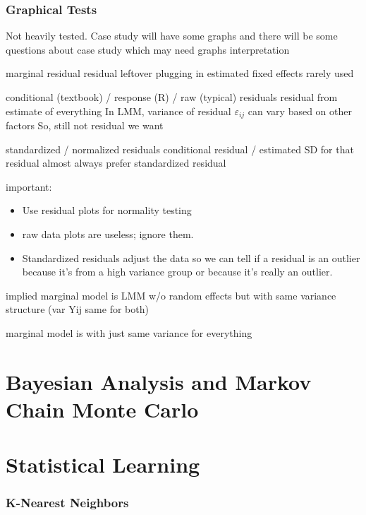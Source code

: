 \documentclass[english]{article}
\begin{document}
\begin{multicols*}{2}
\section{Graphical Tests}
Not heavily tested.
	Case study will have some graphs and there will be some questions about case study which may need graphs interpretation
	
marginal residual
	residual leftover plugging in estimated fixed effects
	rarely used
	
conditional (textbook) / response (R) / raw (typical) residuals
	residual from estimate of everything
	In LMM, variance of residual $\varepsilon_{ij}$ can vary based on other factors
	So, still not residual we want

	
standardized / normalized residuals
	conditional residual / estimated SD for that residual
	almost always prefer standardized residual
	
important:
\begin{itemize}
	\item	Use residual plots for normality testing
	\item	raw data plots are useless; ignore them.
	\item	Standardized residuals adjust the data so we can tell if a residual is an outlier because it's from a high variance group or because it's really an outlier.
\end{itemize}


implied marginal model is LMM w/o random effects but with same variance structure (var Yij same for both)

marginal model is with just same variance for everything 

\newpage
\part{Bayesian Analysis and Markov Chain Monte Carlo}\label{part:BAandMCMC}



\newpage
\part{Statistical Learning}\label{part:statLearn}
\section{K-Nearest Neighbors}\label{sec:KNN}


\newpage

\end{multicols*}
\end{document}
